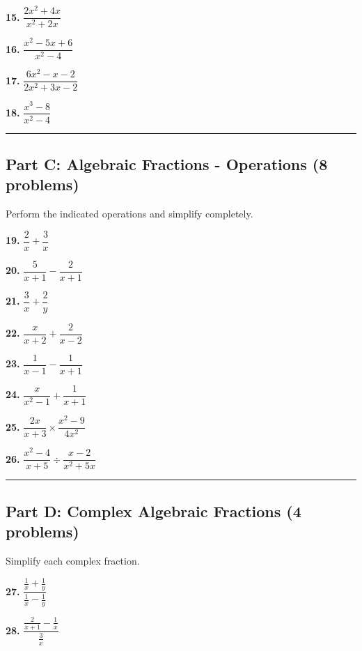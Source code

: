 \documentclass[
  11pt,
]{article}
\begin{document}
\textbf{15.} \(\dfrac{2x^2 + 4x}{x^2 + 2x}\)

\textbf{16.} \(\dfrac{x^2 - 5x + 6}{x^2 - 4}\)

\textbf{17.} \(\dfrac{6x^2 - x - 2}{2x^2 + 3x - 2}\)

\textbf{18.} \(\dfrac{x^3 - 8}{x^2 - 4}\)

\begin{center}\rule{0.5\linewidth}{0.5pt}\end{center}

\hypertarget{part-c-algebraic-fractions---operations-8-problems}{%
\subsection{Part C: Algebraic Fractions - Operations (8
problems)}\label{part-c-algebraic-fractions---operations-8-problems}}

Perform the indicated operations and simplify completely.

\textbf{19.} \(\dfrac{2}{x} + \dfrac{3}{x}\)

\textbf{20.} \(\dfrac{5}{x+1} - \dfrac{2}{x+1}\)

\textbf{21.} \(\dfrac{3}{x} + \dfrac{2}{y}\)

\textbf{22.} \(\dfrac{x}{x+2} + \dfrac{2}{x-2}\)

\textbf{23.} \(\dfrac{1}{x-1} - \dfrac{1}{x+1}\)

\textbf{24.} \(\dfrac{x}{x^2-1} + \dfrac{1}{x+1}\)

\textbf{25.} \(\dfrac{2x}{x+3} \times \dfrac{x^2 - 9}{4x^2}\)

\textbf{26.} \(\dfrac{x^2 - 4}{x + 5} \div \dfrac{x - 2}{x^2 + 5x}\)

\begin{center}\rule{0.5\linewidth}{0.5pt}\end{center}

\hypertarget{part-d-complex-algebraic-fractions-4-problems}{%
\subsection{Part D: Complex Algebraic Fractions (4
problems)}\label{part-d-complex-algebraic-fractions-4-problems}}

Simplify each complex fraction.

\textbf{27.}
\(\dfrac{\frac{1}{x} + \frac{1}{y}}{\frac{1}{x} - \frac{1}{y}}\)

\textbf{28.} \(\dfrac{\frac{2}{x+1} - \frac{1}{x}}{\frac{3}{x}}\)
\end{document}
